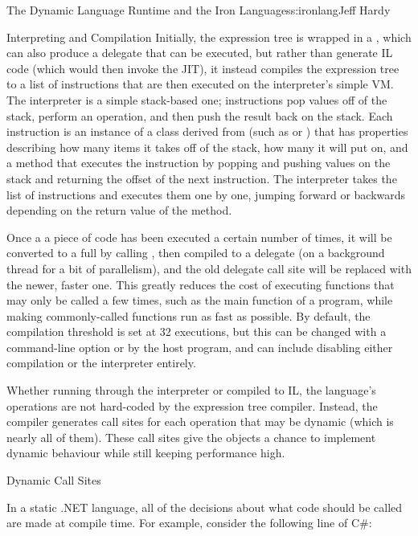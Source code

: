 \begin{aosachapter}{The Dynamic Language Runtime and the Iron Languages}{s:ironlang}{Jeff Hardy}
\begin{aosasect1}{Interpreting and Compilation}
Initially, the expression tree is wrapped in a ,
which can also produce a delegate that can be executed, but rather than
generate IL code (which would then invoke the JIT), it instead compiles the
expression tree to a list of instructions that are then executed on the
interpreter's simple VM. The interpreter is a simple stack-based one;
instructions pop values off of the stack, perform an operation, and then push
the result back on the stack. Each instruction is an instance of a class
derived from  (such as
 or ) that has properties
describing how many items it takes off of the stack, how many it will put on,
and a  method that executes the instruction by popping and pushing
values on the stack and returning the offset of the next instruction. The
interpreter takes the list of instructions and executes them one by one,
jumping forward or backwards depending on the return value of the 
method.

Once a a piece of code has been executed a certain number of times, it will be
converted to a full  by calling
, then compiled to a 
delegate (on a background thread for a bit of parallelism), and the old
delegate call site will be replaced with the newer, faster one. This greatly
reduces the cost of executing functions that may only be called a few times,
such as the main function of a program, while making commonly-called functions
run as fast as possible. By default, the compilation threshold is set at 32
executions, but this can be changed with a command-line option or by the host
program, and can include disabling either compilation or the interpreter 
entirely.

Whether running through the interpreter or compiled to IL, the language's
operations are not hard-coded by the expression tree compiler. Instead, the
compiler generates call sites for each operation that may be dynamic (which is
nearly all of them). These call sites give the objects a chance to implement
dynamic behaviour while still keeping performance high.

\end{aosasect1}

\begin{aosasect1}{Dynamic Call Sites}

In a static .NET language, all of the decisions about what code should be
called are made at compile time. For example, consider the following line of
C\#:


\end{aosasect1}
\end{aosachapter}
